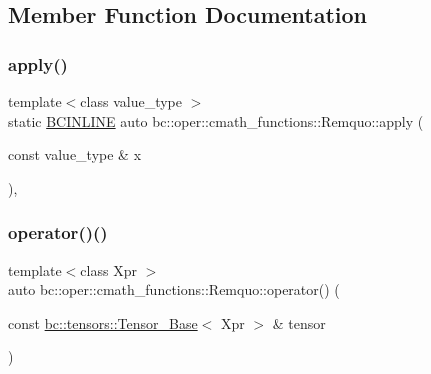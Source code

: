 \subsection{Member Function Documentation}
\mbox{\label{structbc_1_1oper_1_1cmath__functions_1_1Remquo_a25ae56dde322f06a02b4f695ae5a1a0d}} 
\subsubsection{\texorpdfstring{apply()}{apply()}}
{\footnotesize\ttfamily template$<$class value\+\_\+type $>$ \\
static \hyperlink{common_8h_a6699e8b0449da5c0fafb878e59c1d4b1}{B\+C\+I\+N\+L\+I\+NE} auto bc\+::oper\+::cmath\+\_\+functions\+::\+Remquo\+::apply (\begin{DoxyParamCaption}\item[{const value\+\_\+type \&}]{x }\end{DoxyParamCaption})\hspace{0.3cm}{\ttfamily [inline]}, {\ttfamily [static]}}

\mbox{\label{structbc_1_1oper_1_1cmath__functions_1_1Remquo_a1f4d2e215620347cee0d47ab67d5c52f}} 
\subsubsection{\texorpdfstring{operator()()}{operator()()}\hspace{0.1cm}{\footnotesize\ttfamily [1/3]}}
{\footnotesize\ttfamily template$<$class Xpr $>$ \\
auto bc\+::oper\+::cmath\+\_\+functions\+::\+Remquo\+::operator() (\begin{DoxyParamCaption}\item[{const \hyperlink{classbc_1_1tensors_1_1Tensor__Base}{bc\+::tensors\+::\+Tensor\+\_\+\+Base}$<$ Xpr $>$ \&}]{tensor }\end{DoxyParamCaption})\hspace{0.3cm}{\ttfamily [inline]}}

